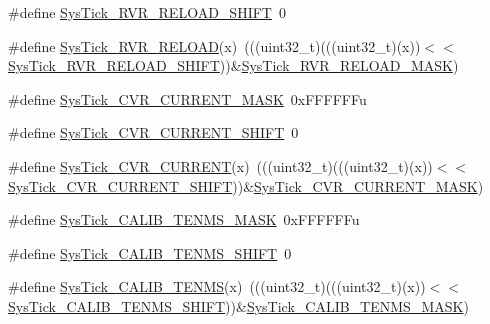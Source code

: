 \begin{DoxyCompactItemize}
\item 
\#define \hyperlink{group___sys_tick___register___masks_gaada5987ab8604965af6e1437c97ee963}{Sys\+Tick\+\_\+\+R\+V\+R\+\_\+\+R\+E\+L\+O\+A\+D\+\_\+\+S\+H\+I\+FT}~0
\item 
\#define \hyperlink{group___sys_tick___register___masks_gaab84497fc1ee448346a37dec6c8971d0}{Sys\+Tick\+\_\+\+R\+V\+R\+\_\+\+R\+E\+L\+O\+AD}(x)~(((uint32\+\_\+t)(((uint32\+\_\+t)(x))$<$$<$\hyperlink{group___sys_tick___register___masks_gaada5987ab8604965af6e1437c97ee963}{Sys\+Tick\+\_\+\+R\+V\+R\+\_\+\+R\+E\+L\+O\+A\+D\+\_\+\+S\+H\+I\+FT}))\&\hyperlink{group___sys_tick___register___masks_gaec96452b3f6bd6a6ca6496cbbad9a9aa}{Sys\+Tick\+\_\+\+R\+V\+R\+\_\+\+R\+E\+L\+O\+A\+D\+\_\+\+M\+A\+SK})
\item 
\#define \hyperlink{group___sys_tick___register___masks_ga24c6d345c97c669b426339ffda71aa8b}{Sys\+Tick\+\_\+\+C\+V\+R\+\_\+\+C\+U\+R\+R\+E\+N\+T\+\_\+\+M\+A\+SK}~0x\+F\+F\+F\+F\+F\+Fu
\item 
\#define \hyperlink{group___sys_tick___register___masks_ga1e9eb575c58a4638dabd21775fa22c19}{Sys\+Tick\+\_\+\+C\+V\+R\+\_\+\+C\+U\+R\+R\+E\+N\+T\+\_\+\+S\+H\+I\+FT}~0
\item 
\#define \hyperlink{group___sys_tick___register___masks_ga497e7408313e5f2d8dfff60fc2a8dd0e}{Sys\+Tick\+\_\+\+C\+V\+R\+\_\+\+C\+U\+R\+R\+E\+NT}(x)~(((uint32\+\_\+t)(((uint32\+\_\+t)(x))$<$$<$\hyperlink{group___sys_tick___register___masks_ga1e9eb575c58a4638dabd21775fa22c19}{Sys\+Tick\+\_\+\+C\+V\+R\+\_\+\+C\+U\+R\+R\+E\+N\+T\+\_\+\+S\+H\+I\+FT}))\&\hyperlink{group___sys_tick___register___masks_ga24c6d345c97c669b426339ffda71aa8b}{Sys\+Tick\+\_\+\+C\+V\+R\+\_\+\+C\+U\+R\+R\+E\+N\+T\+\_\+\+M\+A\+SK})
\item 
\#define \hyperlink{group___sys_tick___register___masks_gac7496217678b52cce71dd785ed2b779b}{Sys\+Tick\+\_\+\+C\+A\+L\+I\+B\+\_\+\+T\+E\+N\+M\+S\+\_\+\+M\+A\+SK}~0x\+F\+F\+F\+F\+F\+Fu
\item 
\#define \hyperlink{group___sys_tick___register___masks_gad2786b21e30185770874c88e29f22047}{Sys\+Tick\+\_\+\+C\+A\+L\+I\+B\+\_\+\+T\+E\+N\+M\+S\+\_\+\+S\+H\+I\+FT}~0
\item 
\#define \hyperlink{group___sys_tick___register___masks_gaaacfe67f549e3e9fa76024d75d610754}{Sys\+Tick\+\_\+\+C\+A\+L\+I\+B\+\_\+\+T\+E\+N\+MS}(x)~(((uint32\+\_\+t)(((uint32\+\_\+t)(x))$<$$<$\hyperlink{group___sys_tick___register___masks_gad2786b21e30185770874c88e29f22047}{Sys\+Tick\+\_\+\+C\+A\+L\+I\+B\+\_\+\+T\+E\+N\+M\+S\+\_\+\+S\+H\+I\+FT}))\&\hyperlink{group___sys_tick___register___masks_gac7496217678b52cce71dd785ed2b779b}{Sys\+Tick\+\_\+\+C\+A\+L\+I\+B\+\_\+\+T\+E\+N\+M\+S\+\_\+\+M\+A\+SK})
$$
\end{DoxyCompactItemize}
